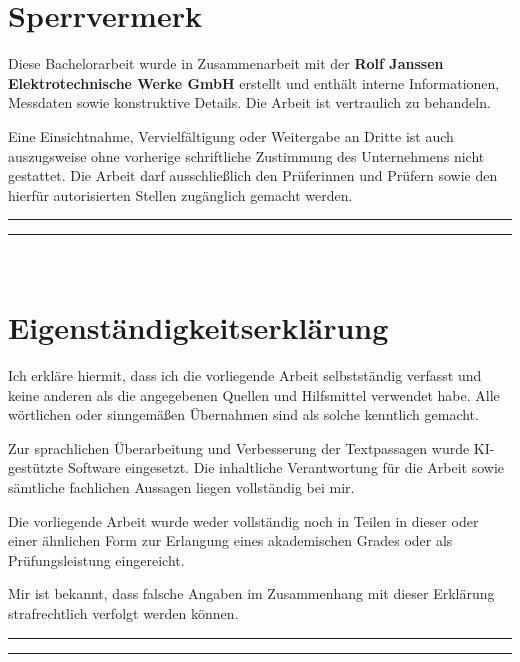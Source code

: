 \documentclass[12pt, a4paper]{scrartcl}
\begin{document}

\section*{Sperrvermerk}

Diese Bachelorarbeit wurde in Zusammenarbeit mit der \textbf{Rolf Janssen Elektrotechnische Werke GmbH} erstellt und enthält interne Informationen, Messdaten sowie konstruktive Details. Die Arbeit ist vertraulich zu behandeln.

Eine Einsichtnahme, Vervielfältigung oder Weitergabe an Dritte ist auch auszugsweise ohne vorherige schriftliche Zustimmung des Unternehmens nicht gestattet. Die Arbeit darf ausschließlich den Prüferinnen und Prüfern sowie den hierfür autorisierten Stellen zugänglich gemacht werden.

\vspace{2.0cm}

\noindent\rule{5cm}{0.4pt} \hfill \rule{5cm}{0.4pt} \\
 \hfill {}

\clearpage

\section*{Eigenständigkeitserklärung}

Ich erkläre hiermit, dass ich die vorliegende Arbeit selbstständig verfasst und keine anderen als die angegebenen Quellen und Hilfsmittel verwendet habe. Alle wörtlichen oder sinngemäßen Übernahmen sind als solche kenntlich gemacht.

Zur sprachlichen Überarbeitung und Verbesserung der Textpassagen wurde KI-gestützte Software eingesetzt. Die inhaltliche Verantwortung für die Arbeit sowie sämtliche fachlichen Aussagen liegen vollständig bei mir.

Die vorliegende Arbeit wurde weder vollständig noch in Teilen in dieser oder einer ähnlichen Form zur Erlangung eines akademischen Grades oder als Prüfungsleistung eingereicht.

Mir ist bekannt, dass falsche Angaben im Zusammenhang mit dieser Erklärung strafrechtlich verfolgt werden können.

\vspace{2.0cm}

\noindent\rule{5cm}{0.4pt} \hfill \rule{5cm}{0.4pt} \\
 \hfill {}
\end{document}
